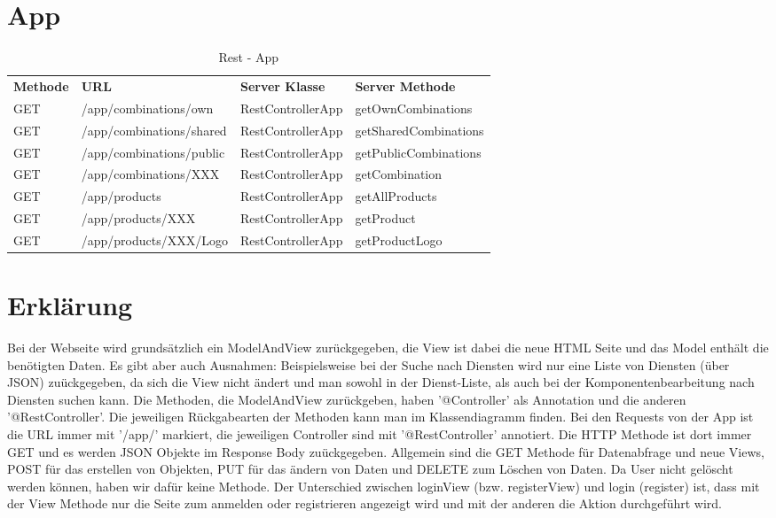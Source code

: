 \section{App}
\begin{table}[h]
	\centering
	\begin{tabularx}{\textwidth}{l l l l}
		\rowcolor[HTML]{C0C0C0}
		\textbf{Methode} & \textbf{URL} & \textbf{Server Klasse} & \textbf{Server Methode} \\
		\rowcolor[HTML]{E7E7E7}
		GET & /app/combinations/own & RestControllerApp & getOwnCombinations \\
		GET & /app/combinations/shared & RestControllerApp & getSharedCombinations \\
		\rowcolor[HTML]{E7E7E7}
		GET & /app/combinations/public & RestControllerApp & getPublicCombinations \\
		GET & /app/combinations/XXX & RestControllerApp & getCombination \\
		\rowcolor[HTML]{E7E7E7}
		GET & /app/products & RestControllerApp & getAllProducts \\
		GET & /app/products/XXX & RestControllerApp & getProduct \\
		\rowcolor[HTML]{E7E7E7}
		GET & /app/products/XXX/Logo & RestControllerApp & getProductLogo \\

	\end{tabularx}
	\caption{Rest - App}
	\label{table:rest-app}
\end{table}

\section{Erklärung}
Bei der Webseite wird grundsätzlich ein ModelAndView zurückgegeben, die View ist dabei die neue HTML Seite und das Model enthält die benötigten Daten.
Es gibt aber auch Ausnahmen: Beispielsweise bei der Suche nach Diensten wird nur eine Liste von Diensten (über JSON) zuückgegeben, da sich die View nicht ändert und man sowohl in der Dienst-Liste, als auch bei der Komponentenbearbeitung nach Diensten suchen kann.
Die Methoden, die ModelAndView zurückgeben, haben '@Controller' als Annotation und die anderen '@RestController'.
Die jeweiligen Rückgabearten der Methoden kann man im Klassendiagramm finden.
Bei den Requests von der App ist die URL immer mit '/app/' markiert, die jeweiligen Controller sind mit '@RestController' annotiert.
Die HTTP Methode ist dort immer GET und es werden JSON Objekte im Response Body zuückgegeben.
Allgemein sind die GET Methode für Datenabfrage und neue Views, POST für das erstellen von Objekten, PUT für das ändern von Daten und DELETE zum Löschen von Daten.
Da User nicht gelöscht werden können, haben wir dafür keine Methode.
Der Unterschied zwischen loginView (bzw. registerView) und login (register) ist, dass mit der View Methode nur die Seite zum anmelden oder registrieren angezeigt wird und mit der anderen die Aktion durchgeführt wird.
